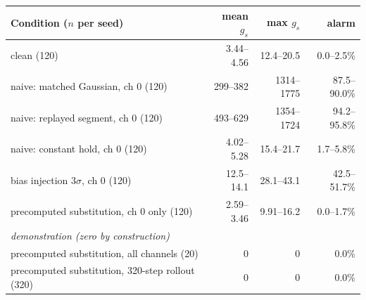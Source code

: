 \begin{tabular}{lrrr}
\toprule
Condition ($n$ per seed) & mean $g_s$ & max $g_s$ & alarm \\
\midrule
clean (120) & 3.44--4.56 & 12.4--20.5 & 0.0--2.5\% \\
naive: matched Gaussian, ch 0 (120) & 299--382 & 1314--1775 & 87.5--90.0\% \\
naive: replayed segment, ch 0 (120) & 493--629 & 1354--1724 & 94.2--95.8\% \\
naive: constant hold, ch 0 (120) & 4.02--5.28 & 15.4--21.7 & 1.7--5.8\% \\
bias injection $3\sigma$, ch 0 (120) & 12.5--14.1 & 28.1--43.1 & 42.5--51.7\% \\
\midrule
precomputed substitution, ch 0 only (120) & 2.59--3.46 & 9.91--16.2 & 0.0--1.7\% \\
\multicolumn{4}{l}{\emph{demonstration (zero by construction)}} \\
precomputed substitution, all channels (20) & $0$ & $0$ & 0.0\% \\
precomputed substitution, 320-step rollout (320) & $0$ & $0$ & 0.0\% \\
\bottomrule
\end{tabular}
